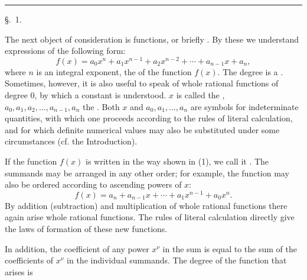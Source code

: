 \thispagestyle{empty}
\begin{center}
{\large{}}

\vspace{0.8em}
{\Large{}}

\vspace{0.8em}
\rule{0.16\linewidth}{0.4pt}

\vspace{0.8em}
{\large \S.\ 1.}

\vspace{0.5em}
{\large{}}
\end{center}

The next object of consideration is 
functions, or briefly . By
these we understand expressions of the following form:
\begin{equation}
 f(x)=a_0x^n+a_1x^{n-1}+a_2x^{n-2}+\cdots+a_{n-1}x+a_n,
\tag{1}
\end{equation}
where $n$ is an integral exponent, the  of the function $f(x)$.
The degree is a . Sometimes, however, it is
also useful to speak of whole rational functions of degree 0, by
which a constant is understood. $x$ is called the ,
$a_0,a_1,a_2,\ldots,a_{n-1},a_n$ the . Both $x$
and $a_0,a_1,\ldots,a_n$ are symbols for indeterminate quantities, with
which one proceeds according to the rules of literal calculation, and
for which definite numerical values may also be substituted under
some circumstances (cf. the Introduction).

If the function $f(x)$ is written in the way shown in (1), we call it
. The summands
may be arranged in any other order; for example, the function may also
be ordered according to ascending powers of $x$:
\[
 f(x)=a_n+a_{n-1}x+\cdots+a_1x^{n-1}+a_0x^n.
\]
By addition (subtraction) and multiplication of whole rational
functions there again arise whole rational functions. The rules of
literal calculation directly give the laws of formation of these new
functions.

In addition, the coefficient of any power $x^\nu$ in the sum is equal
to the sum of the coefficients of $x^\nu$ in the individual summands.
The degree of the function that arises is
